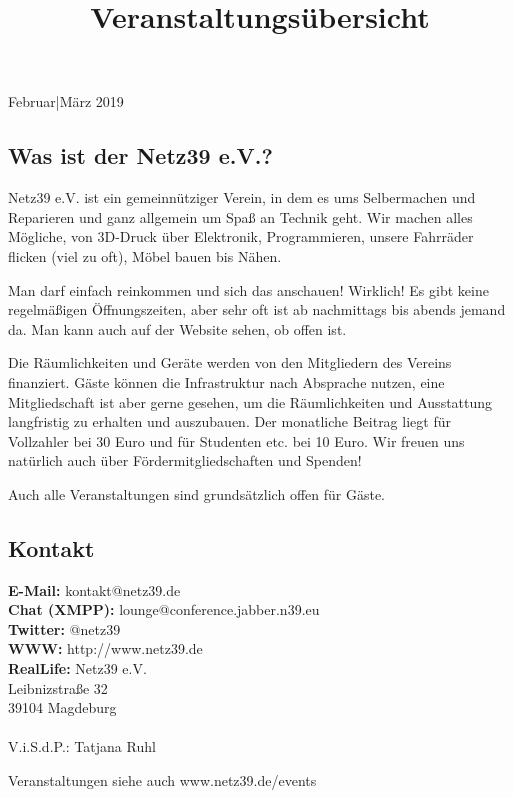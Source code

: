 \documentclass[flyer]{netz39} %
\begin{document}
	
\title{Veranstaltungsübersicht}{Februar|März 2019}

\begin{about}
	\section{Was ist der Netz39 e.V.?}
Netz39 e.V. ist ein gemeinnütziger Verein, in dem es ums Selbermachen und Reparieren und ganz allgemein um Spaß an Technik geht. Wir machen alles Mögliche, von 3D-Druck über Elektronik, Programmieren, unsere Fahrräder flicken (viel zu oft), Möbel bauen bis Nähen. 

Man darf einfach reinkommen und sich das anschauen! Wirklich! Es gibt keine regelmäßigen Öffnungszeiten, aber sehr oft ist ab nachmittags bis abends jemand da. Man kann auch auf der Website sehen, ob offen ist.

Die Räumlichkeiten und Geräte werden von den Mitgliedern des Vereins finanziert. Gäste können die Infrastruktur nach Absprache nutzen, eine Mitgliedschaft ist aber gerne gesehen, um die Räumlichkeiten und Ausstattung langfristig zu erhalten und auszubauen. Der monatliche Beitrag liegt für Vollzahler bei 30 Euro und für Studenten etc. bei 10 Euro. Wir freuen uns natürlich auch über Fördermitgliedschaften und Spenden!

Auch alle Veranstaltungen sind grundsätzlich offen für Gäste.
\end{about}

\begin{contact}
	\section{Kontakt}
	\textbf{E-Mail:} kontakt@netz39.de\\
	\textbf{Chat (XMPP):} lounge@conference.jabber.n39.eu\\
	\textbf{Twitter:} @netz39\\
	\textbf{WWW:} http://www.netz39.de\\
	\textbf{RealLife:} Netz39 e.V.\\
	Leibnizstraße 32\\
	39104 Magdeburg\\\\
	V.i.S.d.P.: Tatjana Ruhl
\end{contact}


\begin{entry}{Veranstaltungen}
siehe auch www.netz39.de/events
\end{entry}
\end{document}
